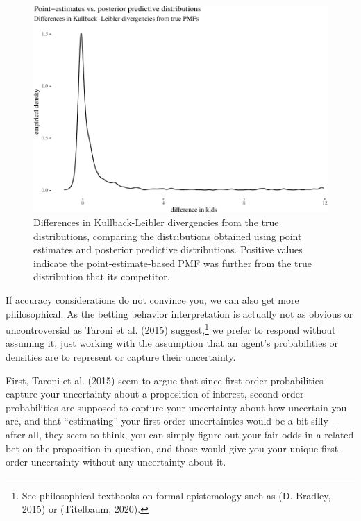 \documentclass[
  10pt,
  dvipsnames,enabledeprecatedfontcommands]{scrartcl}
\begin{document}
\begin{figure}[H]

\begin{center}\includegraphics[width=0.9\linewidth]{chapter-outline_files/figure-latex/fig:kldsPlots-1} \end{center}
\caption{Differences in Kullback-Leibler divergencies from the true distributions, comparing the distributions obtained using point estimates and posterior predictive distributions. Positive values indicate the point-estimate-based PMF was further from the true distribution that its competitor.}
\label{fig:kldsPlots}
\end{figure}

If accuracy considerations do not convince you, we can also get more
philosophical. As the betting behavior interpretation is actually not as
obvious or uncontroversial as Taroni et al. (2015) suggest,\footnote{See
  philosophical textbooks on formal epistemology such as (D. Bradley,
  2015) or (Titelbaum, 2020).} we prefer to respond without assuming it,
just working with the assumption that an agent's probabilities or
densities are to represent or capture their uncertainty.

First, Taroni et al. (2015) seem to argue that since first-order
probabilities capture your uncertainty about a proposition of interest,
second-order probabilities are supposed to capture your uncertainty
about how uncertain you are, and that ``estimating'' your first-order
uncertainties would be a bit silly---after all, they seem to think, you
can simply figure out your fair odds in a related bet on the proposition
in question, and those would give you your unique first-order
uncertainty without any uncertainty about it.
\end{document}
